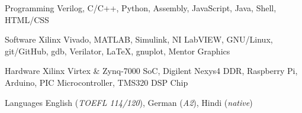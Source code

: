 
\begin{cvskills}

\cvskill
	{Programming} %
	{Verilog, C/C++, Python, Assembly, JavaScript, Java, Shell, HTML/CSS} %

\cvskill
	{Software} %
	{Xilinx Vivado, MATLAB, Simulink, NI LabVIEW, GNU/Linux, git/GitHub, gdb, Verilator, \LaTeX, gnuplot, Mentor Graphics} %

\cvskill
	{Hardware} %
	{Xilinx Virtex \& Zynq-7000 SoC, Digilent Nexys4 DDR, Raspberry Pi, Arduino, PIC Microcontroller, TMS320 DSP Chip} %

\cvskill
	{Languages} %
	{English (\textit{TOEFL 114/120}), German (\textit{A2}), Hindi (\textit{native})} %

\end{cvskills}
